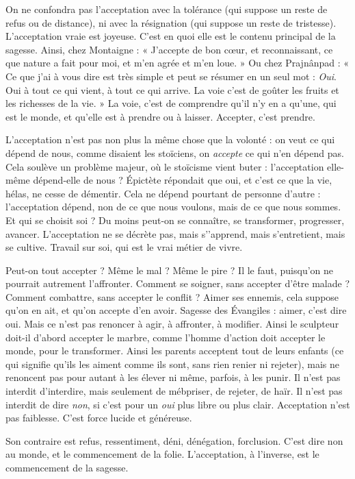 On ne confondra pas l’acceptation avec la tolérance (qui suppose un reste
de refus ou de distance), ni avec la résignation (qui suppose un reste de tristesse).
L’acceptation vraie est joyeuse. C’est en quoi elle est le contenu principal
de la sagesse. Ainsi, chez Montaigne : « J’accepte de bon cœur, et reconnaissant,
ce que nature a fait pour moi, et m'en agrée et m’en loue. » Ou chez
Prajnânpad : « Ce que j'ai à vous dire est très simple et peut se résumer en un
seul mot : {\it Oui}. Oui à tout ce qui vient, à tout ce qui arrive. La voie c’est de
goûter les fruits et les richesses de la vie. » La voie, c’est de comprendre qu’il
n'y en a qu’une, qui est le monde, et qu’elle est à prendre ou à laisser. Accepter,
c’est prendre.

L’acceptation n’est pas non plus la même chose que la volonté : on veut ce
qui dépend de nous, comme disaient les stoïciens, on {\it accepte} ce qui n’en
dépend pas. Cela soulève un problème majeur, où le stoïcisme vient buter :
l'acceptation elle-même dépend-elle de nous ? Épictète répondait que oui, et
c'est ce que la vie, hélas, ne cesse de démentir. Cela ne dépend pourtant de personne
d’autre : l’acceptation dépend, non de ce que nous voulons, mais de ce
que nous sommes. Et qui se choisit soi ? Du moins peut-on se connaître, se
transformer, progresser, avancer. L’acceptation ne se décrète pas, mais
s’'apprend, mais s’entretient, mais se cultive. Travail sur soi, qui est le vrai
métier de vivre.

Peut-on tout accepter ? Même le mal ? Même le pire ? Il le faut, puisqu'on
ne pourrait autrement l’affronter. Comment se soigner, sans accepter d’être
malade ? Comment combattre, sans accepter le conflit ? Aimer ses ennemis,
cela suppose qu’on en ait, et qu’on accepte d’en avoir. Sagesse des Évangiles :
aimer, c’est dire oui. Mais ce n’est pas renoncer à agir, à affronter, à modifier.
Ainsi le sculpteur doit-il d’abord accepter le marbre, comme l’homme d’action
doit accepter le monde, pour le transformer. Ainsi les parents acceptent tout de
leurs enfants (ce qui signifie qu’ils les aiment comme ils sont, sans rien renier
ni rejeter), mais ne renoncent pas pour autant à les élever ni même, parfois, à
les punir. Il n’est pas interdit d’interdire, mais seulement de mébpriser, de
rejeter, de haïr. Il n’est pas interdit de dire {\it non}, si c’est pour un {\it oui} plus libre
ou plus clair. Acceptation n’est pas faiblesse. C’est force lucide et généreuse.

Son contraire est refus, ressentiment, déni, dénégation, forclusion. C’est
dire non au monde, et le commencement de la folie. L’acceptation, à l’inverse,
est le commencement de la sagesse.

